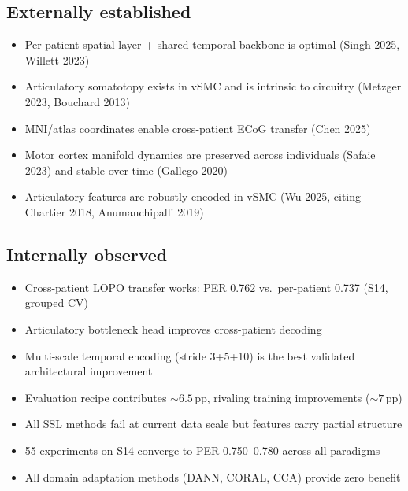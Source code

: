 \documentclass[11pt,letterpaper]{article}
\newcommand{\pp}{\,\text{pp}}
\begin{document}
\subsection*{Externally established}
\begin{itemize}[leftmargin=2em]
\item Per-patient spatial layer + shared temporal backbone is optimal (Singh 2025, Willett 2023)
\item Articulatory somatotopy exists in vSMC and is intrinsic to circuitry (Metzger 2023, Bouchard 2013)
\item MNI/atlas coordinates enable cross-patient ECoG transfer (Chen 2025)
\item Motor cortex manifold dynamics are preserved across individuals (Safaie 2023) and stable over time (Gallego 2020)
\item Articulatory features are robustly encoded in vSMC (Wu 2025, citing Chartier 2018, Anumanchipalli 2019)
\end{itemize}

\subsection*{Internally observed}
\begin{itemize}[leftmargin=2em]
\item Cross-patient LOPO transfer works: PER 0.762 vs.\ per-patient 0.737 (S14, grouped CV)
\item Articulatory bottleneck head improves cross-patient decoding
\item Multi-scale temporal encoding (stride 3+5+10) is the best validated architectural improvement
\item Evaluation recipe contributes ${\sim}6.5\pp$, rivaling training improvements (${\sim}7\pp$)
\item All SSL methods fail at current data scale but features carry partial structure
\item 55 experiments on S14 converge to PER 0.750--0.780 across all paradigms
\item All domain adaptation methods (DANN, CORAL, CCA) provide zero benefit
\end{itemize}
\end{document}
